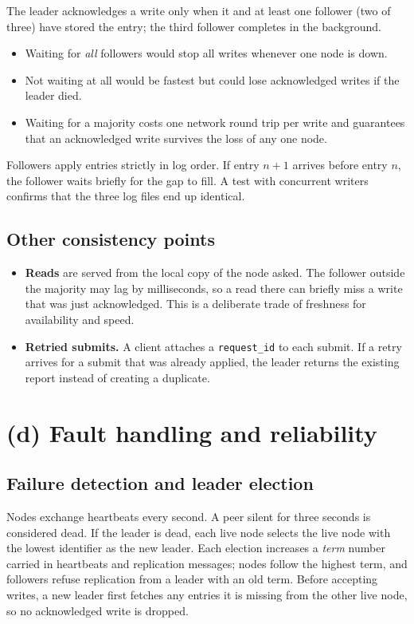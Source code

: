 \documentclass[10pt,a4paper]{article}
\newcommand{\code}[1]{\texttt{#1}}
\begin{document}
The leader acknowledges a write only when it and at least one follower (two of three) have stored
the entry; the third follower completes in the background.

\begin{itemize}
\item Waiting for \emph{all} followers would stop all writes whenever one node is down.
\item Not waiting at all would be fastest but could lose acknowledged writes if the leader died.
\item Waiting for a majority costs one network round trip per write and guarantees that an
acknowledged write survives the loss of any one node.
\end{itemize}

Followers apply entries strictly in log order. If entry $n+1$ arrives before entry $n$, the
follower waits briefly for the gap to fill. A test with concurrent writers confirms that the
three log files end up identical.

\subsection{Other consistency points}

\begin{itemize}
\item \textbf{Reads} are served from the local copy of the node asked. The follower outside the
majority may lag by milliseconds, so a read there can briefly miss a write that was just
acknowledged. This is a deliberate trade of freshness for availability and speed.
\item \textbf{Retried submits.} A client attaches a \code{request\_id} to each submit. If a retry
arrives for a submit that was already applied, the leader returns the existing report instead of
creating a duplicate.
\end{itemize}

\section{(d) Fault handling and reliability}

\subsection{Failure detection and leader election}

Nodes exchange heartbeats every second. A peer silent for three seconds is considered dead. If
the leader is dead, each live node selects the live node with the lowest identifier as the new
leader. Each election increases a \emph{term} number carried in heartbeats and replication
messages; nodes follow the highest term, and followers refuse replication from a leader with an
old term. Before accepting writes, a new leader first fetches any entries it is missing from the
other live node, so no acknowledged write is dropped.
\end{document}
